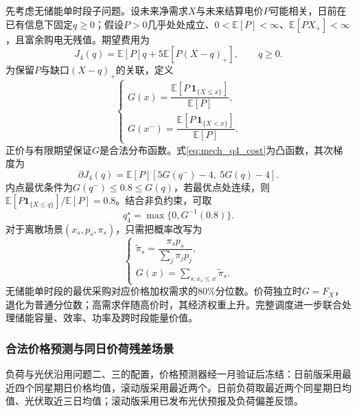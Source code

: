 先考虑无储能单时段子问题。设未来净需求$X$与未来结算电价$P$可能相关，日前在已有信息下固定$q\ge0$；假设$P>0$几乎处处成立、$0<\mathbb E[P]<\infty$、$\mathbb E[PX_+]<\infty$，且富余购电无残值。期望费用为
\begin{equation}
 J_4(q)=\mathbb E[P]q+5\mathbb E[P(X-q)_+],\qquad q\ge0.
 \label{eq:mech_q4_cost}
\end{equation}
为保留$P$与缺口$(X-q)_+$的关联，定义
\begin{equation}
 \begin{cases}
 G(x)=\dfrac{\mathbb E[P\,\mathbf 1_{\{X\le x\}}]}{\mathbb E[P]},\\[6pt]
 G(x^-)=\dfrac{\mathbb E[P\,\mathbf 1_{\{X<x\}}]}{\mathbb E[P]}.
 \end{cases}
 \label{eq:mech_weighted_cdf}
\end{equation}
正价与有限期望保证$G$是合法分布函数。式\eqref{eq:mech_q4_cost}为凸函数，其次梯度为
\begin{equation}
 \partial J_4(q)=\mathbb E[P][5G(q^-)-4,\ 5G(q)-4].
 \label{eq:mech_q4_subgradient}
\end{equation}
内点最优条件为$G(q^-)\le0.8\le G(q)$，若最优点处连续，则
$\mathbb E[P\mathbf 1_{\{X\le q\}}]/\mathbb E[P]=0.8$。结合非负约束，可取
\begin{equation}
 q_4^\star=\max\{0,G^{-1}(0.8)\}.
 \label{eq:mech_weighted_quantile}
\end{equation}
对于离散场景$(x_s,p_s,\pi_s)$，只需把概率改写为
\begin{equation}
 \begin{cases}
 \widetilde\pi_s=\dfrac{\pi_sp_s}{\sum_j\pi_jp_j},\\[6pt]
 G(x)=\displaystyle\sum_{s:x_s\le x}\widetilde\pi_s.
 \end{cases}
 \label{eq:mech_scenario_reweight}
\end{equation}
无储能单时段的最优采购对应价格加权需求的80\%分位数。价荷独立时$G=F_X$，退化为普通分位数；高需求伴随高价时，其经济权重上升。完整调度进一步联合处理储能容量、效率、功率及跨时段能量价值。

\subsubsection{合法价格预测与同日价荷残差场景}

负荷与光伏沿用问题二、三的配置，价格预测器经一月验证后冻结：日前版采用最近四个同星期日价格均值，滚动版采用最近两个。日前负荷取最近两个同星期日均值、光伏取近三日均值；滚动版采用已发布光伏预报及负荷偏差反馈。

